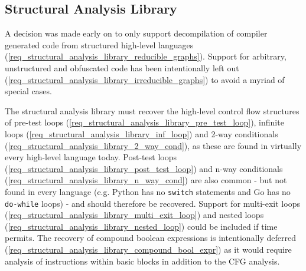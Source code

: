 \documentclass[12pt, a4paper]{article}
\begin{document}

\subsection{Structural Analysis Library}

A decision was made early on to only support decompilation of compiler generated code from structured high-level languages (\ref{req_structural_analysis_library_reducible_graphs}). Support for arbitrary, unstructured and obfuscated code has been intentionally left out (\ref{req_structural_analysis_library_irreducible_graphs}) to avoid a myriad of special cases.

The structural analysis library must recover the high-level control flow structures of pre-test loops (\ref{req_structural_analysis_library_pre_test_loop}), infinite loops (\ref{req_structural_analysis_library_inf_loop}) and 2-way conditionals (\ref{req_structural_analysis_library_2_way_cond}), as these are found in virtually every high-level language today. Post-test loops (\ref{req_structural_analysis_library_post_test_loop}) and n-way conditionals (\ref{req_structural_analysis_library_n_way_cond}) are also common - but not found in every language (e.g. Python has no \texttt{switch} statements and Go has no \texttt{do-while} loops) - and should therefore be recovered. Support for multi-exit loops (\ref{req_structural_analysis_library_multi_exit_loop}) and nested loops (\ref{req_structural_analysis_library_nested_loop}) could be included if time permits. The recovery of compound boolean expressions is intentionally deferred (\ref{req_structural_analysis_library_compound_bool_expr}) as it would require analysis of instructions within basic blocks in addition to the CFG analysis.
\end{document}
